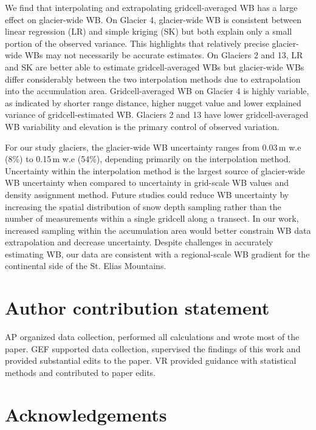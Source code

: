 \documentclass[review,oneside, letterpaper]{igs}
\begin{document}
We find that interpolating and extrapolating gridcell-averaged WB has a large effect on glacier-wide WB. On Glacier 4, glacier-wide WB is consistent between linear regression (LR) and simple kriging (SK) but both explain only a small portion of the observed variance. This highlights that relatively precise glacier-wide WBs may not necessarily be accurate estimates. On Glaciers 2 and 13, LR and SK are better able to estimate gridcell-averaged WBs but glacier-wide WBs differ considerably between the two interpolation methods due to extrapolation into the accumulation area. Gridcell-averaged WB on Glacier 4 is highly variable, as indicated by shorter range distance, higher nugget value and lower explained variance of gridcell-estimated WB. Glaciers 2 and 13 have lower gridcell-averaged WB variability and elevation is the primary control of observed variation.

For our study glaciers, the glacier-wide WB uncertainty ranges from 0.03\,m w.e (8\%) to 0.15\,m w.e (54\%), depending primarily on the interpolation method. Uncertainty within the interpolation method is the largest source of glacier-wide WB uncertainty when compared to uncertainty in grid-scale WB values and density assignment method. Future studies could reduce WB uncertainty by increasing the spatial distribution of snow depth sampling rather than the number of measurements within a single gridcell along a transect. In our work, increased sampling within the accumulation area would better constrain WB data extrapolation and decrease uncertainty. Despite challenges in accurately estimating WB, our data are consistent with a regional-scale WB gradient for the continental side of the St. Elias Mountains. 

\section{Author contribution statement}

AP organized data collection, performed all calculations and wrote most of the paper. GEF supported data collection, supervised the findings of this work and provided substantial edits to the paper. VR provided guidance with statistical methods and contributed to paper edits.

\section{Acknowledgements}
\end{document}
